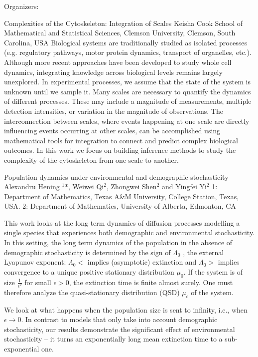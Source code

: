 \label{mini23}

\miniabs
{}
{Organizers: }
{}

\vspace{2ex}
\abs
{Complexities of the Cytoskeleton: Integration of Scales}
{Keisha Cook}
{School of Mathematical and Statistical Sciences, Clemson University, Clemson, South Carolina, USA}
{Biological systems are traditionally studied as isolated processes (e.g. regulatory pathways, motor protein dynamics, transport of organelles, etc.). Although more recent approaches have been developed to study whole cell dynamics, integrating knowledge across biological levels remains largely unexplored. In experimental processes, we assume that the state of the system is unknown until we sample it. Many scales are necessary to quantify the dynamics of different processes. These may include a magnitude of measurements, multiple detection intensities, or variation in the magnitude of observations. The interconnection between scales, where events happening at one scale are directly influencing events occurring at other scales, can be accomplished using mathematical tools for integration to connect and predict complex biological outcomes. In this work we focus on building inference methods to study the complexity of the cytoskeleton from one scale to another. }


\vspace{1.5ex}
\abs
{Population dynamics under environmental and demographic stochasticity}
{Alexandru Hening {$^{1}$*}, Weiwei Qi{$^{2}$}, Zhongwei Shen{$^{2}$} and Yingfei Yi{$^{2}$}}
{1: Department of Mathematics, Texas A\&M University, College Station, Texas, USA. 2: Department of Mathematics,  University of Alberta, Edmonton, CA}
{This work looks at the long term dynamics of diffusion processes modelling a single species that experiences both demographic and environmental stochasticity. In this setting, the long term dynamics of the population in the absence of demographic stochasticity is determined by the sign of $\Lambda_0$ , the external Lyapunov exponent: $\Lambda_0<$ implies (asymptotic) extinction and $\Lambda_0>$  implies convergence to a unique positive stationary distribution $\mu_0$. If the system is of size $\frac{1}{\epsilon^2}$ for small $\epsilon>0$, the extinction time is finite almost surely. One must therefore analyze the quasi-stationary distribution (QSD) $\mu_\epsilon$ of the system.

We look at what happens when the population size is sent to infinity, i.e., when $\epsilon\to 0$. In contrast to models that only take into account demographic stochasticity, our results demonstrate the significant effect of environmental stochasticity – it turns an exponentially long mean extinction time to a sub-exponential one.}


